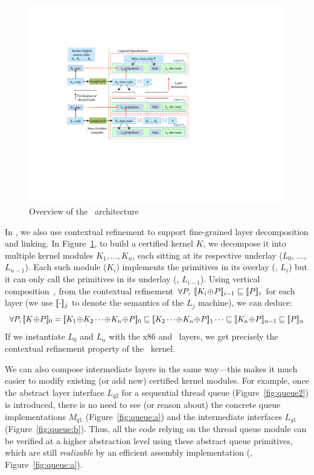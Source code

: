 \begin{figure}[tb] \centering
\includegraphics[scale=1]{figs/archA}
\caption{Overview of the \CTOS\ architecture}
\hrulefill
\label{fig:arch}
\end{figure}

In \CTOS, we also use contextual refinement to support fine-grained
layer decomposition and linking.  In Figure~\ref{fig:arch}, to build a
certified kernel $K$, we decompose it into multiple kernel modules
$K_1,...,K_n$, each sitting at its respective underlay ($L_0$, ...,
$L_{n-1}$). Each such module ($K_i$) implements the primitives in its
overlay (\ie, $L_i$) but it can only call the primitives in its
underlay (\ie, $L_{i-1}$).  Using vertical composition~\cite{dscal15}, from
the contextual refinement $\forall
P,\;\sem{i-1}{K_i\join{}P}\Refrel{}\sem{i}{P}$ for each layer (we use
$\sem{j}{\cdot}$ to denote the semantics of the $L_j$ machine), we can
deduce:
$$\forall P, \sem{0}{K\join{}P} =
\sem{0}{K_1\join{}K_2\cdots\join{}K_n\join{}P} \Refrel
\sem{1}{K_2\cdots\join{}K_n\join{}P} \cdots \Refrel
\sem{n-1}{K_n\join{}P} \Refrel \sem{n}{P}$$
If we instantiate $L_0$
and $L_n$ with the x86 and \mCTOS\ layers, we get precisely the
contextual refinement property of the \mCTOS\ kernel. 

We can also
compose intermediate layers in the same way---this makes it much
easier to modify existing (or add new) certified kernel modules.
For example, once the abstract layer interface
$L_{q2}$
for a sequential thread queue (\cf{}Figure~\ref{fig:queue2}) is introduced,
there is no need to see (or reason about) 
the concrete queue implementations $M_{q1}$
(\cf{}Figure~\ref{fig:queue:a})
and the intermediate interfaces $L_{q1}$ (\cf{}Figure~\ref{fig:queue:b}). 
Thus, all the code relying on the thread queue module can be verified
at a higher abstraction level using these abstract queue primitives,
which are still {\em realizable} by an efficient assembly implementation
(\ie, Figure~\ref{fig:queue:a}).


